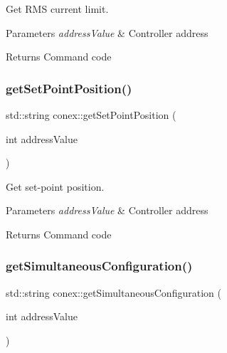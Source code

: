 Get R\+MS current limit. 


\begin{DoxyParams}{Parameters}
{\em address\+Value} & Controller address \\
\hline
\end{DoxyParams}
\begin{DoxyReturn}{Returns}
Command code 
\end{DoxyReturn}
\mbox{\label{namespaceconex_a785c9ad7e52441aef38faeccf75c1e5e}} 
\subsubsection{\texorpdfstring{get\+Set\+Point\+Position()}{getSetPointPosition()}}
{\footnotesize\ttfamily std\+::string conex\+::get\+Set\+Point\+Position (\begin{DoxyParamCaption}\item[{int}]{address\+Value }\end{DoxyParamCaption})}



Get set-\/point position. 


\begin{DoxyParams}{Parameters}
{\em address\+Value} & Controller address \\
\hline
\end{DoxyParams}
\begin{DoxyReturn}{Returns}
Command code 
\end{DoxyReturn}
\mbox{\label{namespaceconex_a66d5bce36b76f68906f18e8a553b07ea}} 
\subsubsection{\texorpdfstring{get\+Simultaneous\+Configuration()}{getSimultaneousConfiguration()}}
{\footnotesize\ttfamily std\+::string conex\+::get\+Simultaneous\+Configuration (\begin{DoxyParamCaption}\item[{int}]{address\+Value }\end{DoxyParamCaption})}



